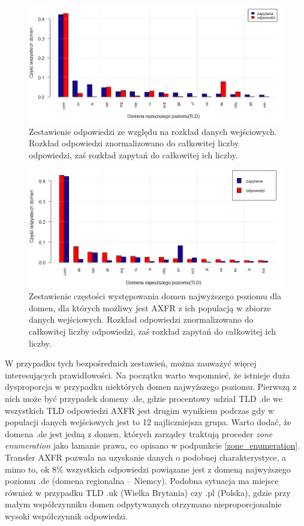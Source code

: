 \begin{figure}[ht]
	\centering
	\includegraphics[width=1.0\textwidth]{image/req_to_resp_no_title}
	\caption{Zestawienie odpowiedzi ze względu na rozkład danych wejściowych. Rozkład odpowiedzi znormalizowano do całkowitej liczby
	odpowiedzi, zaś rozkład zapytań do całkowitej ich liczby.}
	\label{req_to_resp}
\end{figure}

\begin{figure}[ht]
	\centering
	\includegraphics[width=1.0\textwidth]{image/resp_to_req_no_title}
	\caption{Zestawienie częstości występowania domen najwyższego poziomu dla domen, dla których możliwy jest AXFR z ich populacją
	w zbiorze danych wejściowych. Rozkład odpowiedzi znormalizowano do całkowitej liczby
	odpowiedzi, zaś rozkład zapytań do całkowitej ich liczby.}
	\label{resp_to_req}
\end{figure}

W przypadku tych bezpośrednich zestawień, można zauważyć więcej interesujących prawidłowości. Na początku warto wspomnieć, że
istnieje duża dysproporcja w przypadku niektórych domen najwyższego poziomu. Pierwszą z nich może być przypadek domeny .de,
gdzie procentowy udział TLD .de we wszystkich TLD odpowiedzi AXFR jest drugim wynikiem podczas gdy w populacji danych wejściowych
jest to 12 najliczniejsza grupa. Warto dodać, że domena .de jest jedną z domen, których zarządcy traktują proceder
\textit{zone enumeration} jako łamanie prawa, co opisano w podpunkcie \ref{zone_enumeration}. Transfer AXFR pozwala na uzyskanie
danych o podobnej charakterystyce, a mimo to, ok 8\% wszystkich odpowiedzi powiązane jest z domeną najwyższego poziomu .de
(domena regionalna -- Niemcy). Podobna sytuacja ma miejsce również w przypadku TLD .uk (Wielka Brytania) czy .pl (Polska),
gdzie przy małym współczynniku domen odpytywanych otrzymano nieproporcjonalnie wysoki współczynnik odpowiedzi.

